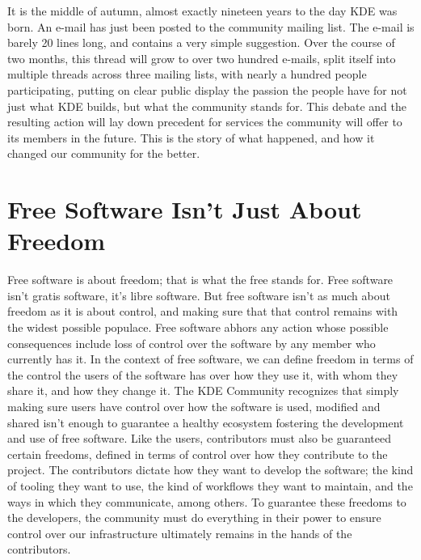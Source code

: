 

\noindent{}It is the middle of autumn, almost exactly nineteen years to the day KDE was born. An e-mail has just been posted to the community mailing list. The e-mail is barely 20 lines long, and contains a very simple suggestion. Over the course of two months, this thread will grow to over two hundred e-mails, split itself into multiple threads across three mailing lists, with nearly a hundred people participating, putting on clear public display the passion the people have for not just what KDE builds, but what the community stands for. This debate and the resulting action will lay down precedent for services the community will offer to its members in the future. This is the story of what happened, and how it changed our community for the better.

\section*{Free Software Isn't Just About Freedom}
Free software is about freedom; that is what the free stands for. Free software isn't gratis software, it's libre software. But free software isn't as much about freedom as it is about control, and making sure that that control remains with the widest possible populace. Free software abhors any action whose possible consequences include loss of control over the software by any member who currently has it. In the context of free software, we can define freedom in terms of the control the users of the software has over how they use it, with whom they share it, and how they change it.
The KDE Community recognizes that simply making sure users have control over how the software is used, modified and shared isn't enough to guarantee a healthy ecosystem fostering the development and use of free software. Like the users, contributors must also be guaranteed certain freedoms, defined in terms of control over how they contribute to the project. The contributors dictate how they want to develop the software; the kind of tooling they want to use, the kind of workflows they want to maintain, and the ways in which they communicate, among others. To guarantee these freedoms to the developers, the community must do everything in their power to ensure control over our infrastructure ultimately remains in the hands of the contributors.

